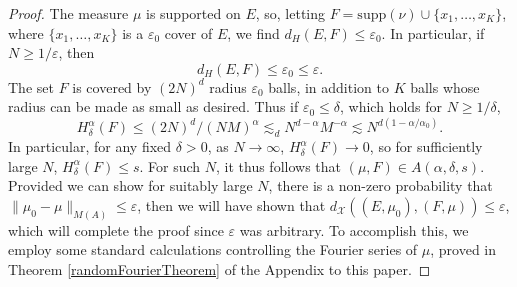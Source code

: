 \documentclass[12pt,reqno]{article}
\begin{document}
\begin{proof}
    The measure $\mu$ is supported on $E$, so, letting $F = \text{supp}(\nu) \cup \{ x_1, \dots, x_K \}$, where $\{ x_1, \dots, x_K \}$ is a $\varepsilon_0$ cover of $E$, we find $d_H(E,F) \leq \varepsilon_0$. In particular, if $N \geq 1/\varepsilon$, then
    \begin{equation} \label{equation19230124574}
        d_H(E,F) \leq \varepsilon_0 \leq \varepsilon.
    \end{equation}
    The set $F$ is covered by $(2N)^d$ radius $\varepsilon_0$ balls, in addition to $K$ balls whose radius can be made as small as desired. Thus if $\varepsilon_0 \leq \delta$, which holds for $N \geq 1/\delta$,
    \[ H^\alpha_\delta(F) \leq (2N)^d / (NM)^\alpha \lesssim_d N^{d-\alpha} M^{-\alpha} \lesssim N^{d(1 - \alpha/\alpha_0)}. \]
    In particular, for any fixed $\delta > 0$, as $N \to \infty$, $H^\alpha_\delta(F) \to 0$, so for sufficiently large $N$, $H^\alpha_\delta(F) \leq s$. For such $N$, it thus follows that $(\mu,F) \in A(\alpha,\delta,s)$. Provided we can show for suitably large $N$, there is a non-zero probability that $\| \mu_0 - \mu \|_{M(A)} \leq \varepsilon$, then we will have shown that $d_{\mathcal{X}}((E,\mu_0),(F,\mu)) \leq \varepsilon$, which will complete the proof since $\varepsilon$ was arbitrary. To accomplish this, we employ some standard calculations controlling the Fourier series of $\mu$, proved in Theorem \ref{randomFourierTheorem} of the Appendix to this paper.


\end{proof}
\end{document}
